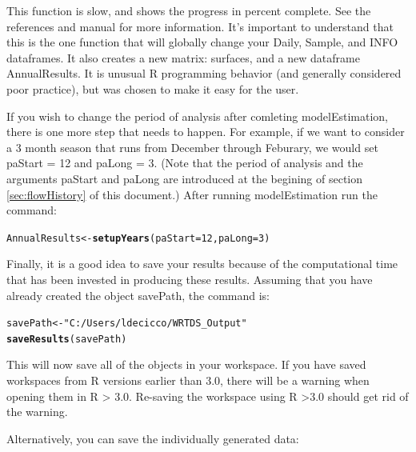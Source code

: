 \documentclass[a4paper,11pt]{article}\usepackage{graphicx, color}
\makeatletter
\newcommand{\hlfunctioncall}[1]{\textcolor[rgb]{0.501960784313725,0,0.329411764705882}{\textbf{#1}}}%
\newcommand{\hlstring}[1]{\textcolor[rgb]{0.6,0.6,1}{#1}}%
\newenvironment{kframe}{%
 \def\at@end@of@kframe{}%
 \ifinner\ifhmode%
  \def\at@end@of@kframe{\end{minipage}}%
  \begin{minipage}{\columnwidth}%
 \fi\fi%
 \def\FrameCommand##1{\hskip\@totalleftmargin \hskip-\fboxsep
 \colorbox{shadecolor}{##1}\hskip-\fboxsep
     \hskip-\linewidth \hskip-\@totalleftmargin \hskip\columnwidth}%
 \MakeFramed {\advance\hsize-\width
   \@totalleftmargin\z@ \linewidth\hsize
   \@setminipage}}%
 {\par\unskip\endMakeFramed%
 \at@end@of@kframe}
\newenvironment{knitrout}{}{} %
\makeatother
\begin{document}
This function is slow, and shows the progress in percent complete. See the references and manual for more information. It's important to understand that this is the one function that will globally change your Daily, Sample, and INFO dataframes. It also creates a new matrix: surfaces, and a new dataframe AnnualResults. It is unusual R programming behavior (and generally considered poor practice), but was chosen to make it easy for the user.

If you wish to change the period of analysis after comleting modelEstimation, there is one more step that needs to happen.  For example, if we want to consider a 3 month season that runs from December through Feburary, we would set paStart = 12 and paLong = 3.  (Note that the period of analysis and the arguments paStart and paLong are introduced at the begining of section \ref{sec:flowHistory} of this document.) After running modelEstimation run the command:

\begin{knitrout}
\color{fgcolor}\begin{kframe}
\begin{alltt}
AnnualResults<-\hlfunctioncall{setupYears}(paStart=12,paLong=3)
\end{alltt}
\end{kframe}
\end{knitrout}



Finally, it is a good idea to save your results because of the computational time that has been invested in producing these results. Assuming that you have already created the object savePath, the command is:

\begin{knitrout}
\color{fgcolor}\begin{kframe}
\begin{alltt}
savePath <- \hlstring{"C:/Users/ldecicco/WRTDS_Output"}
\hlfunctioncall{saveResults}(savePath) 
\end{alltt}
\end{kframe}
\end{knitrout}


This will now save all of the objects in your workspace. If you have saved workspaces from R versions earlier than 3.0, there will be a warning when opening them in R > 3.0. Re-saving the workspace using R >3.0 should get rid of the warning.

Alternatively, you can save the individually generated data:
\end{document}
